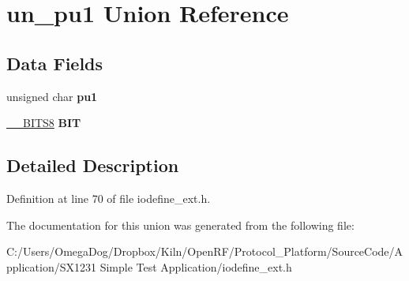 \hypertarget{unionun__pu1}{\section{un\-\_\-pu1 Union Reference}
\label{unionun__pu1}
}
\subsection*{Data Fields}
\begin{DoxyCompactItemize}
\item 
\hypertarget{unionun__pu1_aca48ac7baff7f1688f02b2a010e0a032}{unsigned char {\bfseries pu1}}\label{unionun__pu1_aca48ac7baff7f1688f02b2a010e0a032}

\item 
\hypertarget{unionun__pu1_acd52bc4a87d0e00f78807f304931e7a3}{\hyperlink{struct_____b_i_t_s8}{\-\_\-\-\_\-\-B\-I\-T\-S8} {\bfseries B\-I\-T}}\label{unionun__pu1_acd52bc4a87d0e00f78807f304931e7a3}

\end{DoxyCompactItemize}


\subsection{Detailed Description}


Definition at line 70 of file iodefine\-\_\-ext.\-h.



The documentation for this union was generated from the following file\-:\begin{DoxyCompactItemize}
\item 
C\-:/\-Users/\-Omega\-Dog/\-Dropbox/\-Kiln/\-Open\-R\-F/\-Protocol\-\_\-\-Platform/\-Source\-Code/\-Application/\-S\-X1231 Simple Test Application/iodefine\-\_\-ext.\-h\end{DoxyCompactItemize}
